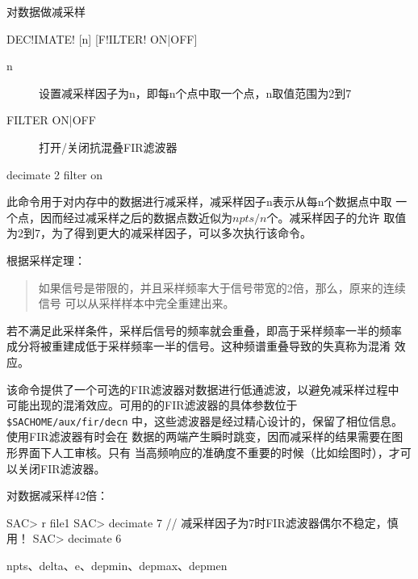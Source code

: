 \label{cmd:decimate}

对数据做减采样

\begin{SACSTX}
DEC!IMATE! [n] [F!ILTER! ON|OFF]
\end{SACSTX}

\begin{description}
\item [n] 设置减采样因子为n，即每n个点中取一个点，n取值范围为2到7
\item [FILTER ON|OFF] 打开/关闭抗混叠FIR滤波器
\end{description}

\begin{SACDFT}
decimate 2 filter on
\end{SACDFT}

此命令用于对内存中的数据进行减采样，减采样因子n表示从每n个数据点中取
一个点，因而经过减采样之后的数据点数近似为$npts/n$个。减采样因子的允许
取值为2到7，为了得到更大的减采样因子，可以多次执行该命令。

根据采样定理：
\begin{quote}
如果信号是带限的，并且采样频率大于信号带宽的2倍，那么，原来的连续信号
可以从采样样本中完全重建出来。
\end{quote}
若不满足此采样条件，采样后信号的频率就会重叠，即高于采样频率一半的频率
成分将被重建成低于采样频率一半的信号。这种频谱重叠导致的失真称为混淆
效应。

该命令提供了一个可选的FIR滤波器对数据进行低通滤波，以避免减采样过程中
可能出现的混淆效应。可用的的FIR滤波器的具体参数位于 \verb|$SACHOME/aux/fir/decn|
中，这些滤波器是经过精心设计的，保留了相位信息。使用FIR滤波器有时会在
数据的两端产生瞬时跳变，因而减采样的结果需要在图形界面下人工审核。只有
当高频响应的准确度不重要的时候（比如绘图时），才可以关闭FIR滤波器。

对数据减采样42倍：
\begin{SACCode}
SAC> r file1
SAC> decimate 7     // 减采样因子为7时FIR滤波器偶尔不稳定，慎用！
SAC> decimate 6
\end{SACCode}

npts、delta、e、depmin、depmax、depmen
